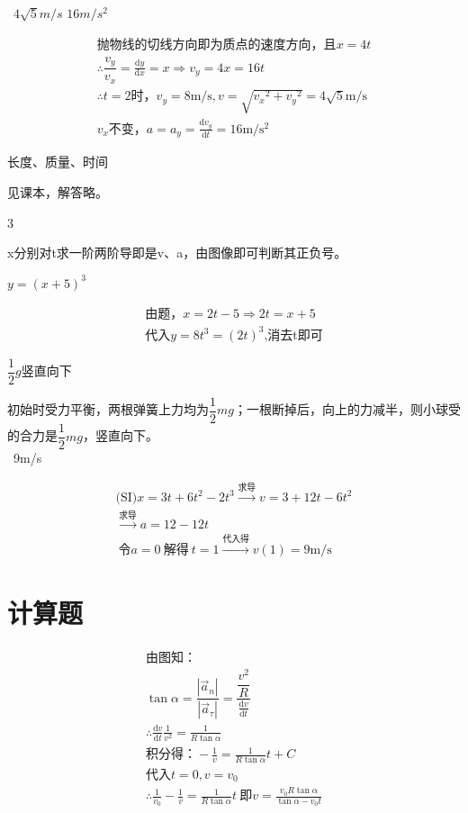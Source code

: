 \documentclass[b5paper,opensource]{qyxf-book}
\newcommand{\di}[1]{\mathrm{d}#1}
\newcommand{\dy}[2]{\frac{\di{#1}}{\di{#2}}}
\begin{document}
\ $4\sqrt{5}m/s$ \qquad $16m/s^2 $ 

\begin{gather*}	
\text{抛物线的切线方向即为质点的速度方向，且}x=4t\\
\therefore \dfrac{v_y}{v_x}=\dy{y}{x}=x\Rightarrow v_y=4x=16t\\
\therefore t=2\text{时，}v_y=8\mathrm{m/s},
v=\sqrt{{v_x}^2+{v_y}^2}=4\sqrt{5}\mathrm{m/s}\\
v_x\text{不变，}a=a_y=\dy{v_y}{t}=16\mathrm{m/s^2}
\end{gather*}

 长度、质量、时间

见课本，解答略。

 3

x分别对t求一阶两阶导即是v、a，由图像即可判断其正负号。

 $y={(x+5)}^3$

\begin{gather*}\text{由题，}x=2t-5\Rightarrow 2t=x+5\\
\text{代入}y=8t^3={(2t)}^3\text{,消去t即可}
\end{gather*}

 $\dfrac{1}{2}g$\qquad 竖直向下

初始时受力平衡，两根弹簧上力均为$\dfrac{1}{2}mg$；一根断掉后，向上的力减半，则小球受的合力是$\dfrac{1}{2}mg$，竖直向下。\\
\ 9m/s 

\begin{gather*}\text{(SI)} x=3t+6t^2-2t^3\xrightarrow{\text{求导}}v=3+12t-6t^2\\
\xrightarrow{\text{求导}}a=12-12t\\\
令a=0\ \text{解得}\ t=1\xrightarrow{\text{代入得}} v(1)=9\mathrm{m/s}
\end{gather*}

\section{计算题}


\begin{gather*}
\text{由图知：}\\
\tan\alpha=\dfrac{|\vec{a}_n|}{|\vec{a}_\tau|}=\dfrac{\dfrac{v^2}{R}}{\dy{v}{t}}\\
\therefore \dy{v}{t}\frac{1}{v^2}=\frac{1}{R\tan\alpha}\\
\text{积分得：}-\frac{1}{v}=\frac{1}{R\tan\alpha}t+C\\
\text{代入}t=0,v=v_0\\
\therefore \frac{1}{v_0}-\frac{1}{v}=\frac{1}{R\tan\alpha}t
\ \text{即}v=\frac{v_0R\tan\alpha}{\tan\alpha-v_0t}
\end{gather*}
\end{document}

